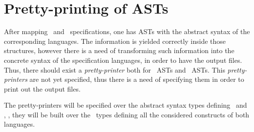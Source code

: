 \section{Pretty-printing of ASTs}
\label{chapter5:sec:pp}

After mapping \vpp\ and \jml\ specifications, one has ASTs with the abstract syntax of the corresponding languages. The information is yielded correctly inside those structures, however there is a need of transforming such information into the concrete syntax of the specification languages, in order to have the output files. Thus, there should exist a \textit{pretty-printer} both for \vpp\ ASTs and \jml\ ASTs. This \textit{pretty-printers} are not yet specified, thus there is a need of specifying them in order to print out the output files.

The pretty-printers will be specified over the abstract syntax types defining \vpp\ and \jml, \ie, they will be built over the \vdm\ types defining all the considered constructs of both languages.




